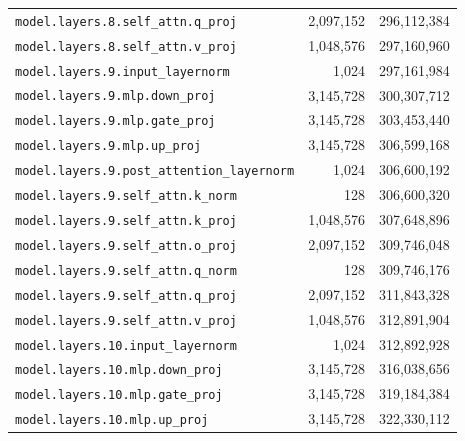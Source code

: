 \documentclass[10pt,a4paper]{article}
\theoremstyle{definition}
\begin{document}
\begin{appendices}
\begin{longtable}{p{9.5cm}rr}
\texttt{model.\allowbreak{}layers.\allowbreak{}8.\allowbreak{}self\_attn.\allowbreak{}q\_proj} & 2,097,152 & 296,112,384 \\
\texttt{model.\allowbreak{}layers.\allowbreak{}8.\allowbreak{}self\_attn.\allowbreak{}v\_proj} & 1,048,576 & 297,160,960 \\
\texttt{model.\allowbreak{}layers.\allowbreak{}9.\allowbreak{}input\_layernorm} & 1,024 & 297,161,984 \\
\texttt{model.\allowbreak{}layers.\allowbreak{}9.\allowbreak{}mlp.\allowbreak{}down\_proj} & 3,145,728 & 300,307,712 \\
\texttt{model.\allowbreak{}layers.\allowbreak{}9.\allowbreak{}mlp.\allowbreak{}gate\_proj} & 3,145,728 & 303,453,440 \\
\texttt{model.\allowbreak{}layers.\allowbreak{}9.\allowbreak{}mlp.\allowbreak{}up\_proj} & 3,145,728 & 306,599,168 \\
\texttt{model.\allowbreak{}layers.\allowbreak{}9.\allowbreak{}post\_attention\_layernorm} & 1,024 & 306,600,192 \\
\texttt{model.\allowbreak{}layers.\allowbreak{}9.\allowbreak{}self\_attn.\allowbreak{}k\_norm} & 128 & 306,600,320 \\
\texttt{model.\allowbreak{}layers.\allowbreak{}9.\allowbreak{}self\_attn.\allowbreak{}k\_proj} & 1,048,576 & 307,648,896 \\
\texttt{model.\allowbreak{}layers.\allowbreak{}9.\allowbreak{}self\_attn.\allowbreak{}o\_proj} & 2,097,152 & 309,746,048 \\
\texttt{model.\allowbreak{}layers.\allowbreak{}9.\allowbreak{}self\_attn.\allowbreak{}q\_norm} & 128 & 309,746,176 \\
\texttt{model.\allowbreak{}layers.\allowbreak{}9.\allowbreak{}self\_attn.\allowbreak{}q\_proj} & 2,097,152 & 311,843,328 \\
\texttt{model.\allowbreak{}layers.\allowbreak{}9.\allowbreak{}self\_attn.\allowbreak{}v\_proj} & 1,048,576 & 312,891,904 \\
\texttt{model.\allowbreak{}layers.\allowbreak{}10.\allowbreak{}input\_layernorm} & 1,024 & 312,892,928 \\
\texttt{model.\allowbreak{}layers.\allowbreak{}10.\allowbreak{}mlp.\allowbreak{}down\_proj} & 3,145,728 & 316,038,656 \\
\texttt{model.\allowbreak{}layers.\allowbreak{}10.\allowbreak{}mlp.\allowbreak{}gate\_proj} & 3,145,728 & 319,184,384 \\
\texttt{model.\allowbreak{}layers.\allowbreak{}10.\allowbreak{}mlp.\allowbreak{}up\_proj} & 3,145,728 & 322,330,112 \\

\end{longtable}
\end{appendices}
\end{document}
